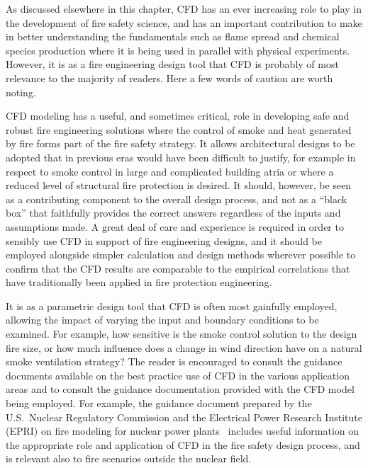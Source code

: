 \documentclass[graybox]{svmult}
\begin{document}
As discussed elsewhere in this chapter, CFD has an ever increasing role to play in the development of fire safety science, and has an important contribution to make in better understanding the fundamentals such as flame spread and chemical species production where it is being used in parallel with physical experiments. However, it is as a fire engineering design tool that CFD is probably of most relevance to the majority of readers. Here a few words of caution are worth noting.

CFD modeling has a useful, and sometimes critical, role in developing safe and robust fire engineering solutions where the control of smoke and heat generated by fire forms part of the fire safety strategy. It allows architectural designs to be adopted that in previous eras would have been difficult to justify, for example in respect to smoke control in large and complicated building atria or where a reduced level of structural fire protection is desired. It should, however, be seen as a contributing component to the overall design process, and not as a ``black box'' that faithfully provides the correct answers regardless of the inputs and assumptions made. A great deal of care and experience is required in order to sensibly use CFD in support of fire engineering designs, and it should be employed alongside simpler calculation and design methods wherever possible to confirm that the CFD results are comparable to the empirical correlations that have traditionally been applied in fire protection engineering.

It is as a parametric design tool that CFD is often most gainfully employed, allowing the impact of varying the input and boundary conditions to be examined. For example, how sensitive is the smoke control solution to the design fire size, or how much influence does a change in wind direction have on a natural smoke ventilation strategy? The reader is encouraged to consult the guidance documents available on the best practice use of CFD in the various application areas and to consult the guidance documentation provided with the CFD model being employed. For example, the guidance document prepared by the U.S.~Nuclear Regulatory Commission and the Electrical Power Research Institute (EPRI) on fire modeling for nuclear power plants~\cite{Stroup:2012} includes useful information on the appropriate role and application of CFD in the fire safety design process, and is relevant also to fire scenarios outside the nuclear field.
\end{document}
